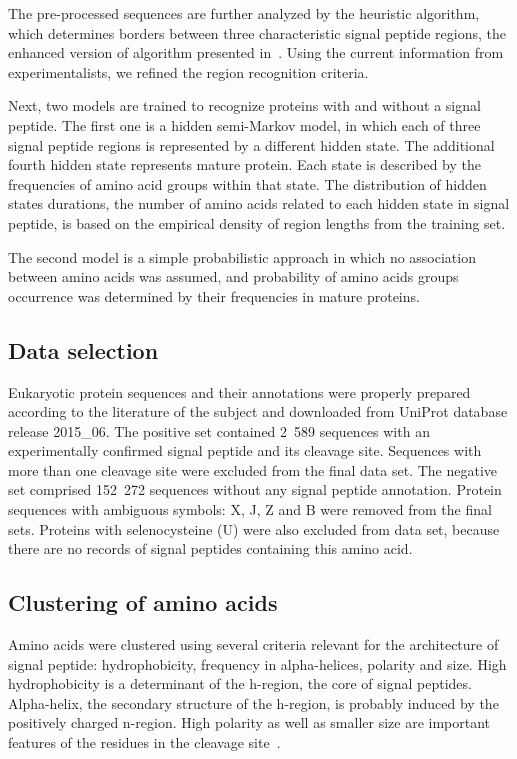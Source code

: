 \documentclass[fleqn,10pt,twoside]{gcb15submission}
\begin{document}
The pre-processed sequences are further analyzed by the heuristic algorithm, which determines borders between three characteristic signal peptide regions, the enhanced version of algorithm presented in~\cite{1998nielsenprediction}. Using the current information from experimentalists, we refined the region recognition criteria.

Next, two models are trained to recognize proteins with and without a signal peptide. The first one is a hidden semi-Markov model, in which each of three signal peptide regions is represented by a different hidden state. The additional fourth hidden state represents mature protein. Each state is described by the frequencies of amino acid groups  within that state. The distribution of hidden states durations, the number of amino acids related to each hidden state in signal peptide, is based on the empirical density of region lengths from the training set. 

The second model is a simple probabilistic approach in which no association between amino acids was assumed, and probability of amino acids groups occurrence was determined by their frequencies in mature proteins.

\subsection*{Data selection}


Eukaryotic protein sequences and their annotations were properly prepared according to the literature of the subject and downloaded from UniProt database release 2015\_06. The positive set contained 2~589 sequences with an experimentally confirmed signal peptide and its cleavage site. Sequences with more than one cleavage site were excluded from the final data set. The negative set comprised 152~272 sequences without any signal peptide annotation. Protein sequences with ambiguous symbols: X, J, Z and B were removed from the final sets. Proteins with selenocysteine (U) were also excluded from data set, because there are no records of signal peptides containing this amino acid.

\subsection*{Clustering of amino acids}

Amino acids were clustered using several criteria relevant for the architecture of signal peptide: hydrophobicity, frequency in alpha-helices, polarity and size. High hydrophobicity is a determinant of the h-region, the core of signal peptides. Alpha-helix, the secondary structure of the h-region, is probably induced by the positively charged n-region. High polarity as well as smaller size are important features of the residues in the cleavage site~\citep{1994palzkillselection}.
\end{document}
